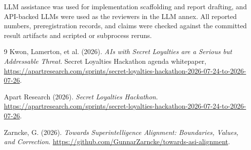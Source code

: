 \documentclass[11pt]{article}
\begin{document}
LLM assistance was used for implementation scaffolding and report drafting,
and API-backed LLMs were used as the reviewers in the LLM annex. All
reported numbers, preregistration records, and claims were checked against
the committed result artifacts and scripted or subprocess reruns.

\begin{thebibliography}{9}
Kwon, Lamerton, et al. (2026).
\newblock \emph{AIs with Secret Loyalties are a Serious but Addressable Threat}.
\newblock Secret Loyalties Hackathon agenda whitepaper,
\url{https://apartresearch.com/sprints/secret-loyalties-hackathon-2026-07-24-to-2026-07-26}.

Apart Research (2026).
\newblock \emph{Secret Loyalties Hackathon}.
\newblock \url{https://apartresearch.com/sprints/secret-loyalties-hackathon-2026-07-24-to-2026-07-26}.

Zarncke, G. (2026).
\newblock \emph{Towards Superintelligence Alignment: Boundaries, Values, and Correction}.
\newblock \url{https://github.com/GunnarZarncke/towards-asi-alignment}.
\end{thebibliography}
\end{document}

